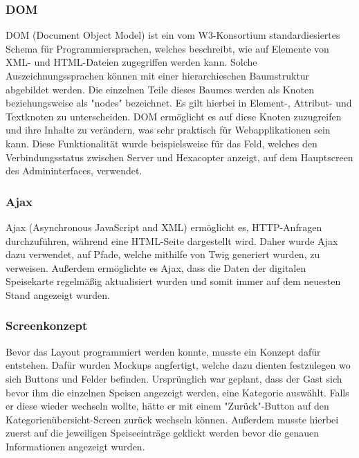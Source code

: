     \subsubsection{DOM}

{DOM\cite{dom}} (Document Object Model) ist ein vom W3-Konsortium standardiesiertes Schema für Programmiersprachen, welches beschreibt, wie auf Elemente von XML- und HTML-Dateien zugegriffen werden kann. Solche Auszeichnungssprachen können mit einer hierarchieschen Baumstruktur abgebildet werden. Die einzelnen Teile dieses Baumes werden als Knoten beziehungsweise als "nodes" bezeichnet.  Es gilt hierbei in Element-, Attribut- und Textknoten zu unterscheiden. DOM ermöglicht es auf diese Knoten zuzugreifen und ihre Inhalte zu verändern, was sehr praktisch für Webapplikationen sein kann. Diese Funktionalität wurde beispielsweise für das Feld, welches den Verbindungsstatus zwischen Server und Hexacopter anzeigt, auf dem Hauptscreen des Admininterfaces, verwendet.

    \subsubsection{Ajax}

{Ajax\cite{ajax}} (Asynchronous JavaScript and XML) ermöglicht es, HTTP-Anfragen durchzuführen, während eine HTML-Seite dargestellt wird. Daher wurde Ajax dazu verwendet, auf Pfade, welche mithilfe von Twig generiert wurden, zu verweisen. Außerdem ermöglichte es Ajax, dass die Daten der digitalen Speisekarte regelmäßig aktualisiert wurden und somit immer auf dem neuesten Stand angezeigt wurden.

    \subsubsection{Screenkonzept}
Bevor das Layout programmiert werden konnte, musste ein Konzept dafür entstehen. Dafür wurden Mockups angfertigt, welche dazu dienten festzulegen wo sich Buttons und Felder befinden.
Ursprünglich war geplant, dass der Gast sich bevor ihm die einzelnen Speisen angezeigt werden, eine Kategorie auswählt. Falls er diese wieder wechseln wollte, hätte er mit einem "Zurück"-Button auf den Kategorienübersicht-Screen zurück wechseln können. Außerdem musste hierbei zuerst auf die jeweiligen Speiseeinträge geklickt werden bevor die genauen Informationen angezeigt wurden.
\\
\pagebreak

